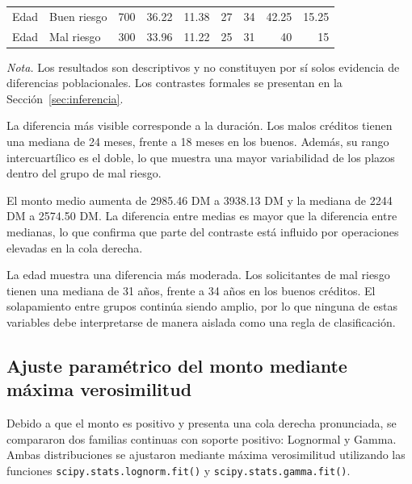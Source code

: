 \begin{table}[H]
{\begin{tabular}{
            @{}
            l
            l
            r
            r
            r
            r
            r
            r
            r
            @{}
        }
            \addlinespace

            Edad
            & Buen riesgo
            & 700
            & \num{36.22}
            & \num{11.38}
            & \num{27}
            & \num{34}
            & \num{42.25}
            & \num{15.25} \\

            Edad
            & Mal riesgo
            & 300
            & \num{33.96}
            & \num{11.22}
            & \num{25}
            & \num{31}
            & \num{40}
            & \num{15} \\

            \bottomrule
        \end{tabular}
    }

    \begin{minipage}{\textwidth}
        \footnotesize
        \textit{Nota.} Los resultados son descriptivos y no constituyen
        por sí solos evidencia de diferencias poblacionales. Los
        contrastes formales se presentan en la
        Sección~\ref{sec:inferencia}.
    \end{minipage}
\end{table}

La diferencia más visible corresponde a la duración. Los malos créditos
tienen una mediana de \num{24} meses, frente a \num{18} meses en los
buenos. Además, su rango intercuartílico es el doble, lo que muestra una
mayor variabilidad de los plazos dentro del grupo de mal riesgo.

El monto medio aumenta de \num{2985.46} DM a \num{3938.13} DM y la
mediana de \num{2244} DM a \num{2574.50} DM. La diferencia entre medias
es mayor que la diferencia entre medianas, lo que confirma que parte del
contraste está influido por operaciones elevadas en la cola derecha.

La edad muestra una diferencia más moderada. Los solicitantes de mal
riesgo tienen una mediana de \num{31} años, frente a \num{34} años en
los buenos créditos. El solapamiento entre grupos continúa siendo amplio,
por lo que ninguna de estas variables debe interpretarse de manera
aislada como una regla de clasificación.

\subsection{Ajuste paramétrico del monto mediante máxima verosimilitud}

Debido a que el monto es positivo y presenta una cola derecha
pronunciada, se compararon dos familias continuas con soporte positivo:
Lognormal y Gamma. Ambas distribuciones se ajustaron mediante máxima
verosimilitud utilizando las funciones
\texttt{scipy.stats.lognorm.fit()} y
\texttt{scipy.stats.gamma.fit()}.

